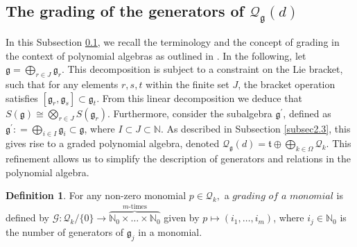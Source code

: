 \documentclass[10pt]{amsart}
\theoremstyle{definition}
\newtheorem{definition}[theorem]{Definition}
\theoremstyle{corollary}
\theoremstyle{remark}
\theoremstyle{conclusion}
\begin{document}
\subsection{The grading of the generators of $\mathcal{Q}_\mathfrak{g}(d)$}
\label{2.4}

In this Subsection \ref{2.4}, we recall the terminology and the concept of grading in the context of polynomial algebras as outlined in \cite{campoamor2025On}.  In the following, let $\mathfrak{g} = \bigoplus_{r \in J} \mathfrak{g}_r$. This decomposition is subject to a constraint on the Lie bracket, such that for any elements $r, s, t$ within the finite set $J$, the bracket operation satisfies $[\mathfrak{g}_r,\mathfrak{g}_s] \subset \mathfrak{g}_t$.  From this linear decomposition we deduce that $S(\mathfrak{g}) \cong \bigotimes_{r \in J} S(\mathfrak{g}_r)$. Furthermore, consider the subalgebra $\mathfrak{g}^\prime$, defined as $\mathfrak{g}^\prime : = \bigoplus_{i \in I} \mathfrak{g}_i \subset \mathfrak{g}$, where $I\subset J \subset \mathbb{N}$. As described in Subsection \ref{subsec2.3}, this gives rise to a graded polynomial algebra, denoted $\mathcal{Q}_\mathfrak{g}(d) = \mathfrak{t} \oplus \bigoplus_{k \in \Omega} \mathcal{Q}_k$.  This refinement allows us to simplify the description of generators and relations in the polynomial algebra. 

\begin{definition}
\label{gradingd}
   For any non-zero monomial $p \in \mathcal{Q}_k,$ a $\textit{grading of a monomial}$ is defined by $\mathcal{G} : \mathcal{Q}_k/\{0\}\rightarrow \overbrace{\mathbb{N}_0 \times \ldots \times \mathbb{N}_0}^{\text{$m$-times}}$ given by $p   \mapsto (i_1,\ldots,i_m)$, where $i_j \in \mathbb{N}_0 $ is the number of generators of $\mathfrak{g}_j$ in a monomial. 
\end{definition}
\end{document}
